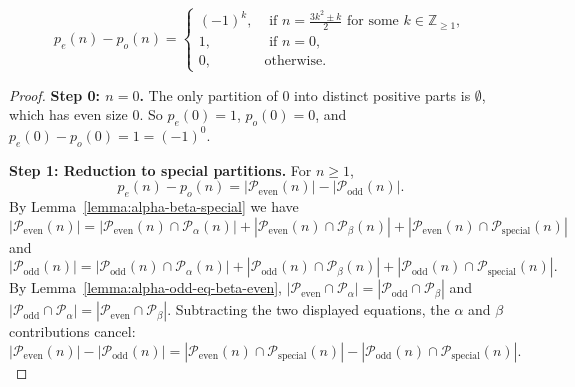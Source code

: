 \begin{lemma}\label{lemma:pe-minus-po-closed-form}\leanok
$$p_e(n)-p_o(n)=
\begin{cases}(-1)^k,&\mbox{ if } n= \frac{3k^2\pm k}{2} \text{ for some } k \in \mathbb{Z}_{\geq 1},\\
1, & \mbox{ if } n = 0,\\
0, & \mbox{otherwise.}\end{cases}$$
\end{lemma}
\begin{proof}\leanok
\textbf{Step 0: $n = 0$.} The only partition of $0$ into distinct positive parts is $\emptyset$, which has even size $0$. So $p_e(0) = 1$, $p_o(0) = 0$, and $p_e(0) - p_o(0) = 1 = (-1)^0$.

\textbf{Step 1: Reduction to special partitions.} For $n \geq 1$,
\begin{equation}\label{eqn:pe-minus-po}p_e(n)-p_o(n)=\left|\mathcal{P}_{\mathrm{even}}(n)\right|-\left|\mathcal{P}_{\mathrm{odd}}(n)\right|.\end{equation}
By Lemma~\ref{lemma:alpha-beta-special} we have
$$\left|\mathcal{P}_{\mathrm{even}}(n)\right|=\left|\mathcal{P}_{\mathrm{even}}(n)\cap \mathcal{P}_{\alpha}(n)\right|+\left|\mathcal{P}_{\mathrm{even}}(n) \cap \mathcal{P}_{\beta}(n)\right|+\left|\mathcal{P}_{\mathrm{even}}(n)\cap \mathcal{P}_{\mathrm{special}}(n)\right|$$
and
$$\left|\mathcal{P}_{\mathrm{odd}}(n)\right|=\left|\mathcal{P}_{\mathrm{odd}}(n)\cap \mathcal{P}_{\alpha}(n)\right|+\left|\mathcal{P}_{\mathrm{odd}}(n) \cap \mathcal{P}_{\beta}(n)\right|+\left|\mathcal{P}_{\mathrm{odd}}(n)\cap \mathcal{P}_{\mathrm{special}}(n)\right|.$$
By Lemma~\ref{lemma:alpha-odd-eq-beta-even}, $|\mathcal{P}_{\mathrm{even}} \cap \mathcal{P}_\alpha| = |\mathcal{P}_{\mathrm{odd}} \cap \mathcal{P}_\beta|$ and $|\mathcal{P}_{\mathrm{odd}} \cap \mathcal{P}_\alpha| = |\mathcal{P}_{\mathrm{even}} \cap \mathcal{P}_\beta|$. Subtracting the two displayed equations, the $\alpha$ and $\beta$ contributions cancel:
\begin{equation}\label{eqn:Peven-minus-Podd-is-Special}\left|\mathcal{P}_{\mathrm{even}}(n)\right|-\left|\mathcal{P}_{\mathrm{odd}}(n)\right| =\left|\mathcal{P}_{\mathrm{even}}(n)\cap \mathcal{P}_{\mathrm{special}}(n)\right|-\left|\mathcal{P}_{\mathrm{odd}}(n)\cap \mathcal{P}_{\mathrm{special}}(n)\right|.\end{equation}


\end{proof}
